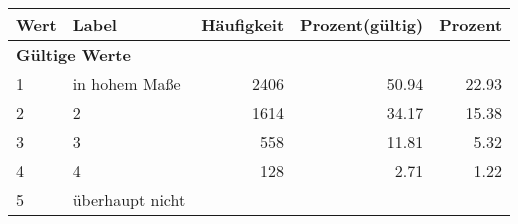      \begin{longtable}{lXrrr}
     \toprule
     \textbf{Wert} & \textbf{Label} & \textbf{Häufigkeit} & \textbf{Prozent(gültig)} & \textbf{Prozent} \\
     \endhead
     \midrule
     \multicolumn{5}{l}{\textbf{Gültige Werte}}\\

     1 &
     \multicolumn{1}{X}{ in hohem Maße   } &


       \num{2406} &
       \num[round-mode=places,round-precision=2]{50.94} &
         \num[round-mode=places,round-precision=2]{22.93} \\

     2 &
     \multicolumn{1}{X}{ 2   } &


       \num{1614} &
       \num[round-mode=places,round-precision=2]{34.17} &
         \num[round-mode=places,round-precision=2]{15.38} \\

     3 &
     \multicolumn{1}{X}{ 3   } &


       \num{558} &
       \num[round-mode=places,round-precision=2]{11.81} &
         \num[round-mode=places,round-precision=2]{5.32} \\

     4 &
     \multicolumn{1}{X}{ 4   } &


       \num{128} &
       \num[round-mode=places,round-precision=2]{2.71} &
         \num[round-mode=places,round-precision=2]{1.22} \\

     5 &
     \multicolumn{1}{X}{ überhaupt nicht   } &



\end{longtable}
